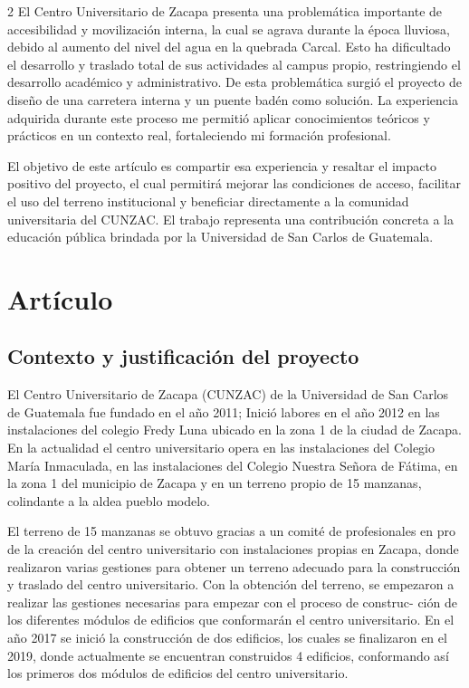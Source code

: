 \documentclass[12pt,spanish,Letterpaper,openany]{book}
\begin{document}
\begin {multicols}{2}
El Centro Universitario de Zacapa presenta una problemática importante de accesibilidad y movilización interna, la cual se agrava durante la época lluviosa, debido al aumento del nivel del agua en la quebrada Carcal. Esto ha dificultado el desarrollo y traslado total de sus actividades al campus propio, restringiendo el desarrollo académico y administrativo. De esta problemática surgió el proyecto de diseño de una carretera interna y un puente badén como solución. La experiencia adquirida durante este proceso me permitió aplicar conocimientos teóricos y prácticos en un contexto real, fortaleciendo mi formación profesional.

El objetivo de este artículo es compartir esa experiencia y resaltar el impacto positivo del proyecto, el cual permitirá mejorar las condiciones de acceso, facilitar el uso del terreno institucional y beneficiar directamente a la comunidad universitaria del CUNZAC. El trabajo representa una contribución concreta a la educación pública brindada por la Universidad de San Carlos de Guatemala.

\hypertarget{artuxedculo-1}{%
\section{Artículo}\label{artuxedculo-1}}

\hypertarget{contexto-y-justificaciuxf3n-del-proyecto}{%
\subsection{Contexto y justificación del proyecto}\label{contexto-y-justificaciuxf3n-del-proyecto}}

El Centro Universitario de Zacapa (CUNZAC) de la Universidad de San Carlos de Guatemala fue fundado en el año 2011; Inició labores en el año 2012 en las instalaciones del colegio Fredy Luna ubicado en la zona 1 de la ciudad de Zacapa. En la actualidad el centro universitario opera en las instalaciones del Colegio María Inmaculada, en las instalaciones del Colegio Nuestra Señora de Fátima, en la zona 1 del municipio de Zacapa y en un terreno propio de 15 manzanas, colindante a la aldea pueblo modelo.

El terreno de 15 manzanas se obtuvo gracias a un comité de profesionales en pro de la creación del centro universitario con instalaciones propias en Zacapa, donde realizaron varias gestiones para obtener un terreno adecuado para la construcción y traslado del centro universitario. Con la obtención del terreno, se empezaron a realizar las gestiones necesarias para empezar con el proceso de construc-
ción de los diferentes módulos de edificios que conformarán el centro universitario. En el año 2017 se inició la construcción de dos edificios, los cuales se finalizaron en el 2019, donde actualmente se encuentran construidos 4 edificios, conformando así los primeros dos módulos de edificios del centro universitario.


\end{multicols}
\end{document}
